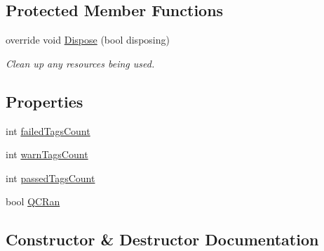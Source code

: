 \subsection*{Protected Member Functions}
\begin{DoxyCompactItemize}
\item 
override void \hyperlink{class_env_int_1_1_win32_1_1_field_tech_1_1_manager_1_1_controls_1_1_q_a_q_c_control_ac44b7b4bfe917a6c6721425da6eef0f5}{Dispose} (bool disposing)
\begin{DoxyCompactList}\small\item\em Clean up any resources being used. \end{DoxyCompactList}\end{DoxyCompactItemize}
\subsection*{Properties}
\begin{DoxyCompactItemize}
\item 
int \hyperlink{class_env_int_1_1_win32_1_1_field_tech_1_1_manager_1_1_controls_1_1_q_a_q_c_control_a8007342d402f31adcdd23f7f36dd3052}{failed\+Tags\+Count}
\item 
int \hyperlink{class_env_int_1_1_win32_1_1_field_tech_1_1_manager_1_1_controls_1_1_q_a_q_c_control_a563bd57346973fb6dd1f89a50b5f78fc}{warn\+Tags\+Count}
\item 
int \hyperlink{class_env_int_1_1_win32_1_1_field_tech_1_1_manager_1_1_controls_1_1_q_a_q_c_control_aceb4addcc9ea229e0b15d33297686807}{passed\+Tags\+Count}
\item 
bool \hyperlink{class_env_int_1_1_win32_1_1_field_tech_1_1_manager_1_1_controls_1_1_q_a_q_c_control_a478d355f4c1bdacb8d408a86ea5589dd}{Q\+C\+Ran}
\end{DoxyCompactItemize}


\subsection{Constructor \& Destructor Documentation}
\hypertarget{class_env_int_1_1_win32_1_1_field_tech_1_1_manager_1_1_controls_1_1_q_a_q_c_control_a9ad3dad955bea12b2e5270c8f729796e}{}
